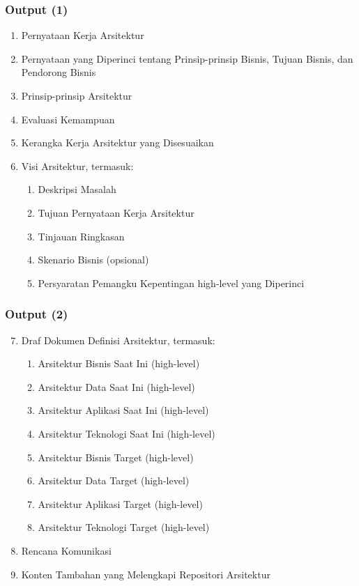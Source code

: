 \documentclass[aspectratio=169]{beamer}
\begin{document}
	\begin{frame}
		\frametitle{Output (1)}
		\begin{enumerate}
			\item Pernyataan Kerja Arsitektur
			\item Pernyataan yang Diperinci tentang Prinsip-prinsip Bisnis, Tujuan Bisnis, dan Pendorong Bisnis
			\item Prinsip-prinsip Arsitektur
			\item Evaluasi Kemampuan
			\item Kerangka Kerja Arsitektur yang Disesuaikan
			\item Visi Arsitektur, termasuk:
			\begin{enumerate}
				\item Deskripsi Masalah
				\item Tujuan Pernyataan Kerja Arsitektur
				\item Tinjauan Ringkasan
				\item Skenario Bisnis (opsional)
				\item Persyaratan Pemangku Kepentingan high-level yang Diperinci
			\end{enumerate}
		\end{enumerate}
	\end{frame}
	
	\begin{frame}
		\frametitle{Output (2)}
		\begin{enumerate}
			\setcounter{enumi}{6}
			\item Draf Dokumen Definisi Arsitektur, termasuk:
			\begin{enumerate}
				\item Arsitektur Bisnis Saat Ini (high-level)
				\item Arsitektur Data Saat Ini (high-level)
				\item Arsitektur Aplikasi Saat Ini (high-level)
				\item Arsitektur Teknologi Saat Ini (high-level)
				\item Arsitektur Bisnis Target (high-level)
				\item Arsitektur Data Target (high-level)
				\item Arsitektur Aplikasi Target (high-level)
				\item Arsitektur Teknologi Target (high-level)
			\end{enumerate}
			\item Rencana Komunikasi
			\item Konten Tambahan yang Melengkapi Repositori Arsitektur
		\end{enumerate}
	\end{frame}
	
\end{document}
